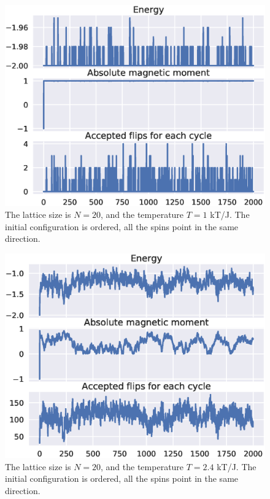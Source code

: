 \documentclass[aps,reprint]{revtex4-1}
\begin{document}
\begin{figure}
  \includegraphics[width=\columnwidth]{figures/4cOrderedT1.eps}
  \caption{The lattice size is $N = 20$, and the temperature $T = 1$ kT/J.
  The initial configuration is ordered, all the spins point in the same direction.}
  \label{fig:L20T1Ordered}
\end{figure}
\begin{figure}
  \includegraphics[width=\columnwidth]{figures/4cOrderedT24.eps}
  \caption{The lattice size is $N = 20$, and the temperature $T = 2.4$ kT/J.
  The initial configuration is ordered, all the spins point in the same direction.}
  \label{fig:L20T24Ordered}
\end{figure}
\end{document}
